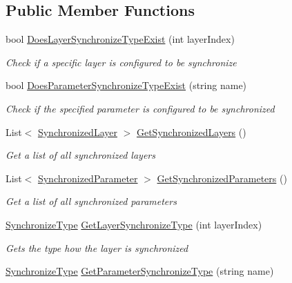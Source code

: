 \subsection*{Public Member Functions}
\begin{DoxyCompactItemize}
\item 
bool \hyperlink{class_photon_animator_view_adc769a9e9d902955529aa36fd7f94c77}{Does\+Layer\+Synchronize\+Type\+Exist} (int layer\+Index)
\begin{DoxyCompactList}\small\item\em Check if a specific layer is configured to be synchronize \end{DoxyCompactList}\item 
bool \hyperlink{class_photon_animator_view_a58c3ae7da3a1217062dd6f510c69e5a8}{Does\+Parameter\+Synchronize\+Type\+Exist} (string name)
\begin{DoxyCompactList}\small\item\em Check if the specified parameter is configured to be synchronized \end{DoxyCompactList}\item 
List$<$ \hyperlink{class_photon_animator_view_1_1_synchronized_layer}{Synchronized\+Layer} $>$ \hyperlink{class_photon_animator_view_a5cd222a56cf3364aea3fa1d2641383ed}{Get\+Synchronized\+Layers} ()
\begin{DoxyCompactList}\small\item\em Get a list of all synchronized layers \end{DoxyCompactList}\item 
List$<$ \hyperlink{class_photon_animator_view_1_1_synchronized_parameter}{Synchronized\+Parameter} $>$ \hyperlink{class_photon_animator_view_a03c466f84479ffeb0509324adfa27c5b}{Get\+Synchronized\+Parameters} ()
\begin{DoxyCompactList}\small\item\em Get a list of all synchronized parameters \end{DoxyCompactList}\item 
\hyperlink{class_photon_animator_view_ae3ad07de936a811cbb923adffe1f167f}{Synchronize\+Type} \hyperlink{class_photon_animator_view_aca2599e3520233dd0a92550d2fef3781}{Get\+Layer\+Synchronize\+Type} (int layer\+Index)
\begin{DoxyCompactList}\small\item\em Gets the type how the layer is synchronized \end{DoxyCompactList}\item 
\hyperlink{class_photon_animator_view_ae3ad07de936a811cbb923adffe1f167f}{Synchronize\+Type} \hyperlink{class_photon_animator_view_ab5c89d5d60a51fdd97b883f85d27a10f}{Get\+Parameter\+Synchronize\+Type} (string name)

\end{DoxyCompactItemize}
